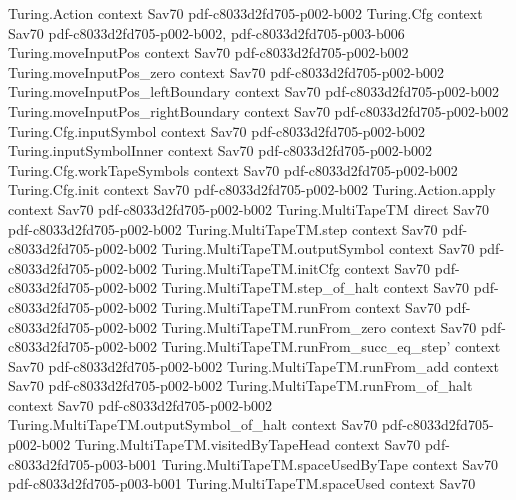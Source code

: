 \begin{theorem}
\label{Turing.NDTM.splice_vertices}
\leanok
\proofstep
  {Turing.Action}
  {context}
  {Sav70}
  {pdf-c8033d2fd705-p002-b002}
\proofstep
  {Turing.Cfg}
  {context}
  {Sav70}
  {pdf-c8033d2fd705-p002-b002,
    pdf-c8033d2fd705-p003-b006}
\proofstep
  {Turing.moveInputPos}
  {context}
  {Sav70}
  {pdf-c8033d2fd705-p002-b002}
\proofstep
  {Turing.moveInputPos_zero}
  {context}
  {Sav70}
  {pdf-c8033d2fd705-p002-b002}
\proofstep
  {Turing.moveInputPos_leftBoundary}
  {context}
  {Sav70}
  {pdf-c8033d2fd705-p002-b002}
\proofstep
  {Turing.moveInputPos_rightBoundary}
  {context}
  {Sav70}
  {pdf-c8033d2fd705-p002-b002}
\proofstep
  {Turing.Cfg.inputSymbol}
  {context}
  {Sav70}
  {pdf-c8033d2fd705-p002-b002}
\proofstep
  {Turing.inputSymbolInner}
  {context}
  {Sav70}
  {pdf-c8033d2fd705-p002-b002}
\proofstep
  {Turing.Cfg.workTapeSymbols}
  {context}
  {Sav70}
  {pdf-c8033d2fd705-p002-b002}
\proofstep
  {Turing.Cfg.init}
  {context}
  {Sav70}
  {pdf-c8033d2fd705-p002-b002}
\proofstep
  {Turing.Action.apply}
  {context}
  {Sav70}
  {pdf-c8033d2fd705-p002-b002}
\proofstep
  {Turing.MultiTapeTM}
  {direct}
  {Sav70}
  {pdf-c8033d2fd705-p002-b002}
\proofstep
  {Turing.MultiTapeTM.step}
  {context}
  {Sav70}
  {pdf-c8033d2fd705-p002-b002}
\proofstep
  {Turing.MultiTapeTM.outputSymbol}
  {context}
  {Sav70}
  {pdf-c8033d2fd705-p002-b002}
\proofstep
  {Turing.MultiTapeTM.initCfg}
  {context}
  {Sav70}
  {pdf-c8033d2fd705-p002-b002}
\proofstep
  {Turing.MultiTapeTM.step_of_halt}
  {context}
  {Sav70}
  {pdf-c8033d2fd705-p002-b002}
\proofstep
  {Turing.MultiTapeTM.runFrom}
  {context}
  {Sav70}
  {pdf-c8033d2fd705-p002-b002}
\proofstep
  {Turing.MultiTapeTM.runFrom_zero}
  {context}
  {Sav70}
  {pdf-c8033d2fd705-p002-b002}
\proofstep
  {Turing.MultiTapeTM.runFrom_succ_eq_step'}
  {context}
  {Sav70}
  {pdf-c8033d2fd705-p002-b002}
\proofstep
  {Turing.MultiTapeTM.runFrom_add}
  {context}
  {Sav70}
  {pdf-c8033d2fd705-p002-b002}
\proofstep
  {Turing.MultiTapeTM.runFrom_of_halt}
  {context}
  {Sav70}
  {pdf-c8033d2fd705-p002-b002}
\proofstep
  {Turing.MultiTapeTM.outputSymbol_of_halt}
  {context}
  {Sav70}
  {pdf-c8033d2fd705-p002-b002}
\proofstep
  {Turing.MultiTapeTM.visitedByTapeHead}
  {context}
  {Sav70}
  {pdf-c8033d2fd705-p003-b001}
\proofstep
  {Turing.MultiTapeTM.spaceUsedByTape}
  {context}
  {Sav70}
  {pdf-c8033d2fd705-p003-b001}
\proofstep
  {Turing.MultiTapeTM.spaceUsed}
  {context}
  {Sav70}

\end{theorem}
